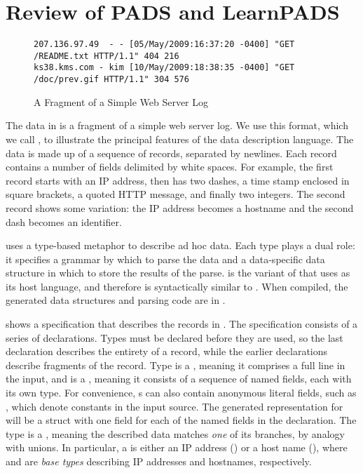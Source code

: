 \section{Review of PADS and LearnPADS}\label{sec:review}
\begin{figure*}
{\small
\begin{verbatim}
207.136.97.49  - - [05/May/2009:16:37:20 -0400] "GET /README.txt HTTP/1.1" 404 216
ks38.kms.com - kim [10/May/2009:18:38:35 -0400] "GET /doc/prev.gif HTTP/1.1" 304 576
\end{verbatim}
}
\caption{A Fragment of a Simple Web Server Log \ai{}}
\label{fig:ai} 
\end{figure*}

The data in  is a fragment of a simple web server log.
We use this format, which we call
\ai{}, to illustrate the principal features of the \pads{} data
description language. The data 
is made up of a sequence of records, separated by newlines.
Each record contains a number of fields delimited by white spaces. 
For example, the first record starts with an IP address, 
then has two dashes, a time stamp enclosed in
square brackets, a quoted HTTP message, and finally two
integers. The second record shows some variation:
the IP address becomes a hostname and the second dash becomes an identifier.

\pads{} uses a type-based metaphor to
describe ad hoc data.  Each \pads{} type plays a dual role: it
specifies a grammar by which to parse the data and a data-specific
data structure in which to store the results of the parse. 
\padsc{} is the variant of \pads{} that uses \C{} as its host
language, and therefore is syntactically similar to \C{}. 
When compiled, the generated data structures and parsing code 
are in \C{}.

 shows a \padsc{} specification that describes the
records in .  
The specification consists of a
series of declarations. Types must be declared before they are used,
so the last declaration  describes the entirety of a
record, while the earlier declarations describe fragments of the record.  
Type  is a , meaning it comprises a full line in
the input, and is a , meaning it consists of a sequence of
named fields, each with its own type.  For convenience, s
can also contain anonymous literal fields, such as \cd{" ["}, which
denote constants in the input source.  The generated representation
for  will be a \C{} struct with one field for each of the
named fields in the declaration.
The type  is a , meaning the described data
matches \textit{one} of its branches, by analogy with \C{} unions. In
particular, a  is either an IP address () or a
host name (), where  and  are
\padsc{} \textit{base types} describing IP addresses and hostnames,
respectively.  

